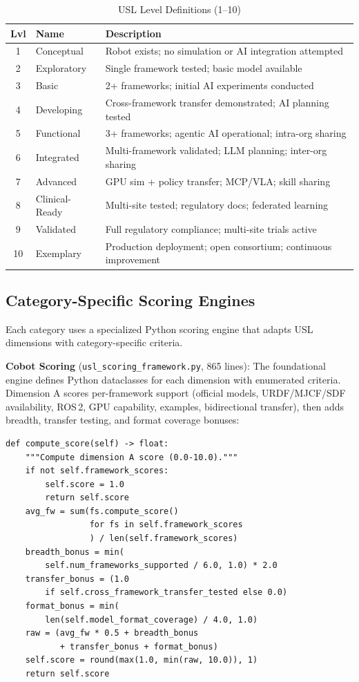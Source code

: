 \documentclass[11pt,a4paper]{article}
\begin{document}
\begin{table}[H]
\centering
\caption{USL Level Definitions (1--10)}
\label{tab:levels}
\small
\begin{tabularx}{\textwidth}{c l X}
\toprule
\textbf{Lvl} & \textbf{Name} & \textbf{Description} \\
\midrule
1 & Conceptual & Robot exists; no simulation or AI integration attempted \\
2 & Exploratory & Single framework tested; basic model available \\
3 & Basic & 2+ frameworks; initial AI experiments conducted \\
4 & Developing & Cross-framework transfer demonstrated; AI planning tested \\
5 & Functional & 3+ frameworks; agentic AI operational; intra-org sharing \\
6 & Integrated & Multi-framework validated; LLM planning; inter-org sharing \\
7 & Advanced & GPU sim + policy transfer; MCP/VLA; skill sharing \\
8 & Clinical-Ready & Multi-site tested; regulatory docs; federated learning \\
9 & Validated & Full regulatory compliance; multi-site trials active \\
10 & Exemplary & Production deployment; open consortium; continuous improvement \\
\bottomrule
\end{tabularx}
\end{table}

\subsection{Category-Specific Scoring Engines}
Each category uses a specialized Python scoring engine that adapts USL dimensions with category-specific criteria.

\textbf{Cobot Scoring} (\texttt{usl\_scoring\_framework.py}, 865 lines): The foundational engine defines Python dataclasses for each dimension with enumerated criteria. Dimension A scores per-framework support (official models, URDF/MJCF/SDF availability, ROS\,2, GPU capability, examples, bidirectional transfer), then adds breadth, transfer testing, and format coverage bonuses:

\begin{lstlisting}[caption={USL Dimension A computation from the cobot scoring engine},label={lst:dima}]
def compute_score(self) -> float:
    """Compute dimension A score (0.0-10.0)."""
    if not self.framework_scores:
        self.score = 1.0
        return self.score
    avg_fw = sum(fs.compute_score()
                 for fs in self.framework_scores
                 ) / len(self.framework_scores)
    breadth_bonus = min(
        self.num_frameworks_supported / 6.0, 1.0) * 2.0
    transfer_bonus = (1.0
        if self.cross_framework_transfer_tested else 0.0)
    format_bonus = min(
        len(self.model_format_coverage) / 4.0, 1.0)
    raw = (avg_fw * 0.5 + breadth_bonus
           + transfer_bonus + format_bonus)
    self.score = round(max(1.0, min(raw, 10.0)), 1)
    return self.score
\end{lstlisting}
\end{document}
